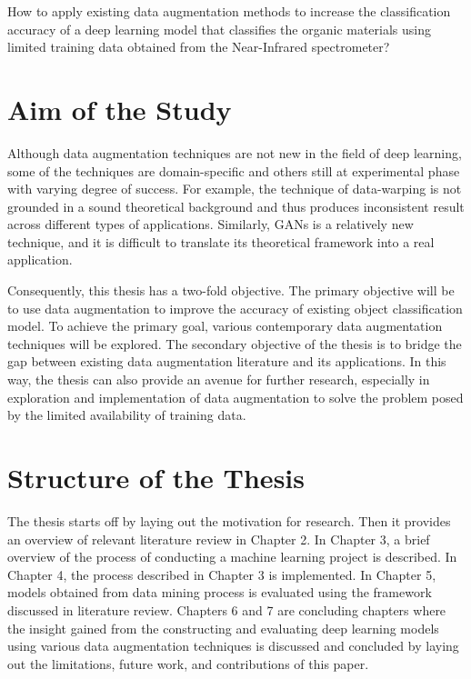 How to apply existing data augmentation methods to increase the classification accuracy of a deep learning model that classifies the organic materials using limited training data obtained from the Near-Infrared spectrometer?

\section{Aim of the Study}

Although data augmentation techniques are not new in the field of deep learning, some of the techniques are domain-specific and others still at experimental phase with varying degree of success. For example, the technique of data-warping is not grounded in a sound theoretical background and thus produces inconsistent result across different types of applications. Similarly, GANs is a relatively new technique, and it is difficult to translate its theoretical framework into a real application.

Consequently, this thesis has a two-fold objective. The primary objective will be to use data augmentation to improve the accuracy of existing object classification model. To achieve the primary goal, various contemporary data augmentation techniques will be explored. The secondary objective of the thesis is to bridge the gap between existing data augmentation literature and its applications. In this way, the thesis can also provide an avenue for further research, especially in exploration and implementation of data augmentation to solve the problem posed by the limited availability of training data. 

\section{Structure of the Thesis}
\label{section:structure} 
The thesis starts off by laying out the motivation for research. Then it provides an overview of relevant literature review in Chapter 2. In Chapter 3, a brief overview of the process of conducting a machine learning project is described. In Chapter 4, the process described in Chapter 3 is implemented. In Chapter 5, models obtained from data mining process is evaluated using the framework discussed in literature review. Chapters 6 and 7 are concluding chapters where the insight gained from the constructing and evaluating deep learning models using various data augmentation techniques is discussed and concluded by laying out the limitations, future work, and contributions of this paper.       

